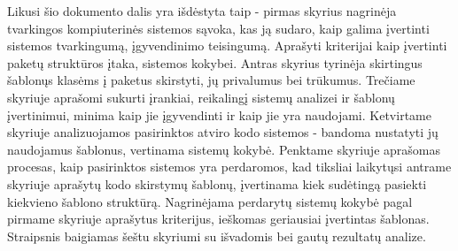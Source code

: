 Likusi šio dokumento dalis yra išdėstyta taip - pirmas skyrius nagrinėja tvarkingos kompiuterinės sistemos sąvoka, kas ją sudaro, kaip galima įvertinti sistemos tvarkingumą, įgyvendinimo teisingumą.
Aprašyti kriterijai kaip įvertinti paketų struktūros įtaka, sistemos kokybei.
Antras skyrius tyrinėja skirtingus šablonųs klasėms į paketus skirstyti, jų privalumus bei trūkumus.
Trečiame skyriuje aprašomi sukurti įrankiai, reikalingį sistemų analizei ir šablonų įvertinimui, minima kaip jie įgyvendinti ir kaip jie yra naudojami.
Ketvirtame skyriuje analizuojamos pasirinktos atviro kodo sistemos - bandoma nustatyti jų naudojamus šablonus, vertinama sistemų kokybė.
Penktame skyriuje aprašomas procesas, kaip pasirinktos sistemos yra perdaromos, kad tiksliai laikytųsi antrame skyriuje aprašytų kodo skirstymų šablonų, įvertinama kiek sudėtingą pasiekti kiekvieno šablono struktūrą.
Nagrinėjama perdarytų sistemų kokybė pagal pirmame skyriuje aprašytus kriterijus, ieškomas geriausiai įvertintas šablonas.
Straipsnis baigiamas šeštu skyriumi su išvadomis bei gautų rezultatų analize.